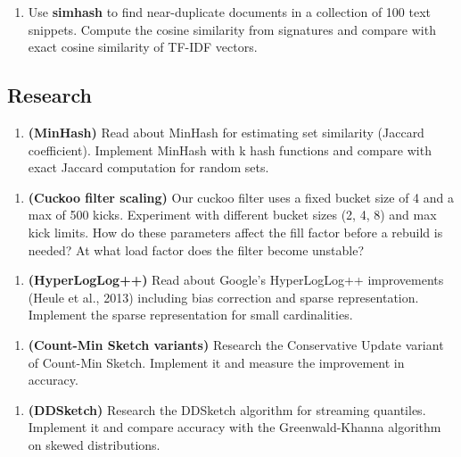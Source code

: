 \begin{enumerate}
\item Use \textbf{simhash} to find near-duplicate documents in a collection of 100 text snippets. Compute the cosine similarity from signatures and compare with exact cosine similarity of TF-IDF vectors.
\end{enumerate}

\subsection{Research}

\begin{enumerate}
\item \textbf{(MinHash)} Read about MinHash for estimating set similarity (Jaccard coefficient). Implement MinHash with k hash functions and compare with exact Jaccard computation for random sets.
\end{enumerate}

\begin{enumerate}
\item \textbf{(Cuckoo filter scaling)} Our cuckoo filter uses a fixed bucket size of 4 and a max of 500 kicks. Experiment with different bucket sizes (2, 4, 8) and max kick limits. How do these parameters affect the fill factor before a rebuild is needed? At what load factor does the filter become unstable?
\end{enumerate}

\begin{enumerate}
\item \textbf{(HyperLogLog++)} Read about Google's HyperLogLog++ improvements (Heule et al., 2013) including bias correction and sparse representation. Implement the sparse representation for small cardinalities.
\end{enumerate}

\begin{enumerate}
\item \textbf{(Count-Min Sketch variants)} Research the Conservative Update variant of Count-Min Sketch. Implement it and measure the improvement in accuracy.
\end{enumerate}

\begin{enumerate}
\item \textbf{(DDSketch)} Research the DDSketch algorithm for streaming quantiles. Implement it and compare accuracy with the Greenwald-Khanna algorithm on skewed distributions.
\end{enumerate}

